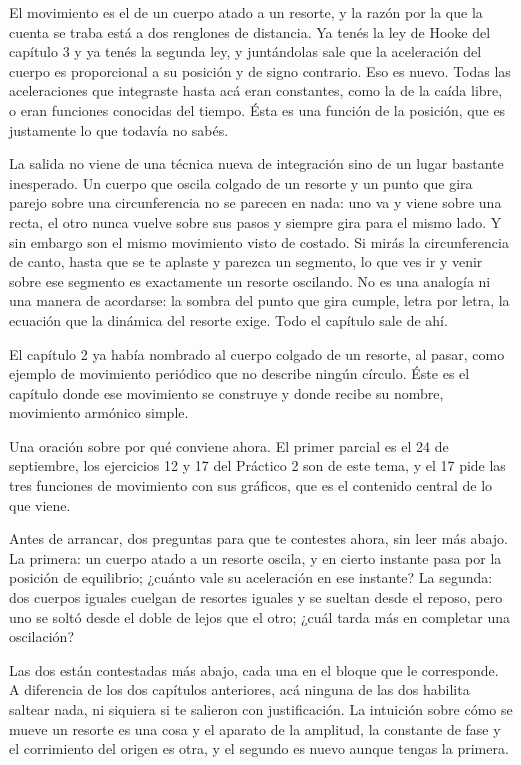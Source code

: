 \documentclass[11pt,openany]{book}
\begin{document}
El movimiento es el de un cuerpo atado a un resorte, y la razón por la que la cuenta se traba está a dos renglones de distancia. Ya tenés la ley de Hooke del capítulo 3 y ya tenés la segunda ley, y juntándolas sale que la aceleración del cuerpo es proporcional a su posición y de signo contrario. Eso es nuevo. Todas las aceleraciones que integraste hasta acá eran constantes, como la de la caída libre, o eran funciones conocidas del tiempo. Ésta es una función de la posición, que es justamente lo que todavía no sabés.

La salida no viene de una técnica nueva de integración sino de un lugar bastante inesperado. Un cuerpo que oscila colgado de un resorte y un punto que gira parejo sobre una circunferencia no se parecen en nada: uno va y viene sobre una recta, el otro nunca vuelve sobre sus pasos y siempre gira para el mismo lado. Y sin embargo son el mismo movimiento visto de costado. Si mirás la circunferencia de canto, hasta que se te aplaste y parezca un segmento, lo que ves ir y venir sobre ese segmento es exactamente un resorte oscilando. No es una analogía ni una manera de acordarse: la sombra del punto que gira cumple, letra por letra, la ecuación que la dinámica del resorte exige. Todo el capítulo sale de ahí.

El capítulo 2 ya había nombrado al cuerpo colgado de un resorte, al pasar, como ejemplo de movimiento periódico que no describe ningún círculo. Éste es el capítulo donde ese movimiento se construye y donde recibe su nombre, movimiento armónico simple.

Una oración sobre por qué conviene ahora. El primer parcial es el 24 de septiembre, los ejercicios 12 y 17 del Práctico 2 son de este tema, y el 17 pide las tres funciones de movimiento con sus gráficos, que es el contenido central de lo que viene.

Antes de arrancar, dos preguntas para que te contestes ahora, sin leer más abajo. La primera: un cuerpo atado a un resorte oscila, y en cierto instante pasa por la posición de equilibrio; ¿cuánto vale su aceleración en ese instante? La segunda: dos cuerpos iguales cuelgan de resortes iguales y se sueltan desde el reposo, pero uno se soltó desde el doble de lejos que el otro; ¿cuál tarda más en completar una oscilación?

Las dos están contestadas más abajo, cada una en el bloque que le corresponde. A diferencia de los dos capítulos anteriores, acá ninguna de las dos habilita saltear nada, ni siquiera si te salieron con justificación. La intuición sobre cómo se mueve un resorte es una cosa y el aparato de la amplitud, la constante de fase y el corrimiento del origen es otra, y el segundo es nuevo aunque tengas la primera.
\end{document}
